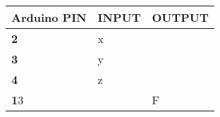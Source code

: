 \begin{tabularx}{0.46\textwidth} { 
  | >{\centering\arraybackslash}X 
  | >{\centering\arraybackslash}X 
  | >{\centering\arraybackslash}X  | }
\hline
\textbf{Arduino PIN} & \textbf{INPUT} & \textbf{OUTPUT} \\ 
\hline
\textbf 2 & x & \\
\hline
\textbf 3 & y & \\
\hline
\textbf 4 & z & \\
\hline
\textbf 13 & & F \\
\hline
\end{tabularx}
